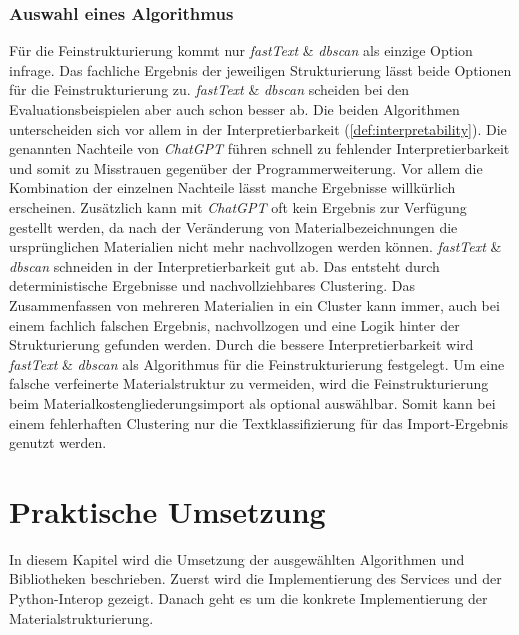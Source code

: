 \subsection{Auswahl eines Algorithmus}
\label{c:comparison:fine-structuring:selection}
Für die Feinstrukturierung kommt nur \textit{fastText} \& \textit{\ac{dbscan}} als einzige Option infrage. Das fachliche Ergebnis der jeweiligen Strukturierung lässt beide Optionen für die Feinstrukturierung zu. \textit{fastText} \& \textit{\ac{dbscan}} scheiden bei den Evaluationsbeispielen aber auch schon besser ab. Die beiden Algorithmen unterscheiden sich vor allem in der Interpretierbarkeit (\autoref{def:interpretability}). Die genannten Nachteile von \textit{ChatGPT} führen schnell zu fehlender Interpretierbarkeit und somit zu Misstrauen gegenüber der Programmerweiterung.
Vor allem die Kombination der einzelnen Nachteile lässt manche Ergebnisse willkürlich erscheinen. Zusätzlich kann mit \textit{ChatGPT} oft kein Ergebnis zur Verfügung gestellt werden, da nach der Veränderung von Materialbezeichnungen die ursprünglichen Materialien nicht mehr nachvollzogen werden können.
\textit{fastText} \& \textit{\ac{dbscan}} schneiden in der Interpretierbarkeit gut ab. Das entsteht durch deterministische Ergebnisse und nachvollziehbares Clustering. Das Zusammenfassen von mehreren Materialien in ein Cluster kann immer, auch bei einem fachlich falschen Ergebnis, nachvollzogen und eine Logik hinter der Strukturierung gefunden werden. Durch die bessere Interpretierbarkeit wird \textit{fastText} \& \textit{\ac{dbscan}} als Algorithmus für die Feinstrukturierung festgelegt. Um eine falsche verfeinerte Materialstruktur zu vermeiden, wird die Feinstrukturierung beim Materialkostengliederungsimport als optional auswählbar. Somit kann bei einem fehlerhaften Clustering nur die Textklassifizierung für das Import-Ergebnis genutzt werden.

\chapter{Praktische Umsetzung}
\label{c:implementation}
In diesem Kapitel wird die Umsetzung der ausgewählten Algorithmen und Bibliotheken beschrieben. Zuerst wird die Implementierung des Services und der Python-Interop gezeigt. Danach geht es um die konkrete Implementierung der Materialstrukturierung.

